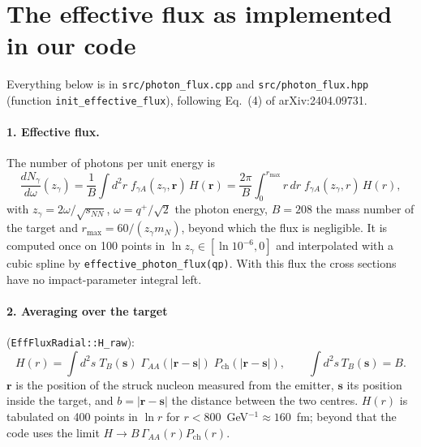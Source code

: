 \documentclass[11pt]{article}
\begin{document}
\section{The effective flux as implemented in our code}

Everything below is in \texttt{src/photon\_flux.cpp} and \texttt{src/photon\_flux.hpp}
(function \texttt{init\_effective\_flux}), following Eq.~(4) of arXiv:2404.09731.

\paragraph{1. Effective flux.} The number of photons per unit energy is
\begin{equation}
  \frac{dN_\gamma}{d\omega}(z_\gamma)=\frac{1}{B}\int d^2r\;f_{\gamma A}(z_\gamma,\mathbf r)\,H(\mathbf r)
  =\frac{2\pi}{B}\int_0^{r_{\max}} r\,dr\;f_{\gamma A}(z_\gamma,r)\,H(r),
\end{equation}
with $z_\gamma=2\omega/\sqrt{s_{NN}}$, $\omega=q^+/\sqrt2$ the photon energy, $B=208$ the mass number
of the target and $r_{\max}=60/(z_\gamma m_N)$, beyond which the flux is negligible. It is computed
once on 100 points in $\ln z_\gamma\in[\ln10^{-6},0]$ and interpolated with a cubic spline by
\texttt{effective\_photon\_flux(qp)}. With this flux the cross sections have no impact-parameter
integral left.

\paragraph{2. Averaging over the target} (\texttt{EffFluxRadial::H\_raw}):
\begin{equation}
  H(r)=\int d^2s\;T_B(\mathbf s)\;\Gamma_{AA}(|\mathbf r-\mathbf s|)\;P_{\text{ch}}(|\mathbf r-\mathbf s|),
  \qquad \int d^2s\,T_B(\mathbf s)=B .
\end{equation}
$\mathbf r$ is the position of the struck nucleon measured from the emitter, $\mathbf s$ its position
inside the target, and $b=|\mathbf r-\mathbf s|$ the distance between the two centres. $H(r)$ is
tabulated on 400 points in $\ln r$ for $r<800$~GeV$^{-1}\approx160$~fm; beyond that the code uses the
limit $H\to B\,\Gamma_{AA}(r)P_{\text{ch}}(r)$.
\end{document}
